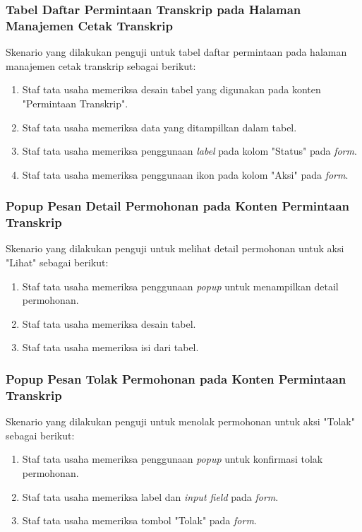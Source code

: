 \subsubsection{Tabel Daftar Permintaan Transkrip pada Halaman Manajemen Cetak Transkrip}
Skenario yang dilakukan penguji untuk tabel daftar permintaan pada halaman manajemen cetak transkrip sebagai berikut:
\begin{enumerate}
	\item Staf tata usaha memeriksa desain tabel yang digunakan pada konten "Permintaan Transkrip".
	\item Staf tata usaha memeriksa data yang ditampilkan dalam tabel.
	\item Staf tata usaha memeriksa penggunaan \textit{label} pada kolom "Status" pada \textit{form}.
	\item Staf tata usaha memeriksa penggunaan ikon pada kolom "Aksi" pada \textit{form}.
\end{enumerate}

\subsubsection{Popup Pesan Detail Permohonan pada Konten Permintaan Transkrip}
Skenario yang dilakukan penguji untuk melihat detail permohonan untuk aksi "Lihat" sebagai berikut:
\begin{enumerate}
	\item Staf tata usaha memeriksa penggunaan \textit{popup} untuk menampilkan detail permohonan.
	\item Staf tata usaha memeriksa desain tabel.	
	\item Staf tata usaha memeriksa isi dari tabel.
\end{enumerate}

\subsubsection{Popup Pesan Tolak Permohonan pada Konten Permintaan Transkrip}
Skenario yang dilakukan penguji untuk menolak permohonan untuk aksi "Tolak" sebagai berikut:
\begin{enumerate}
	\item Staf tata usaha memeriksa penggunaan \textit{popup} untuk konfirmasi tolak permohonan.
	\item Staf tata usaha memeriksa label dan \textit{input field} pada \textit{form}.
	\item Staf tata usaha memeriksa tombol "Tolak" pada \textit{form}.	
\end{enumerate}

